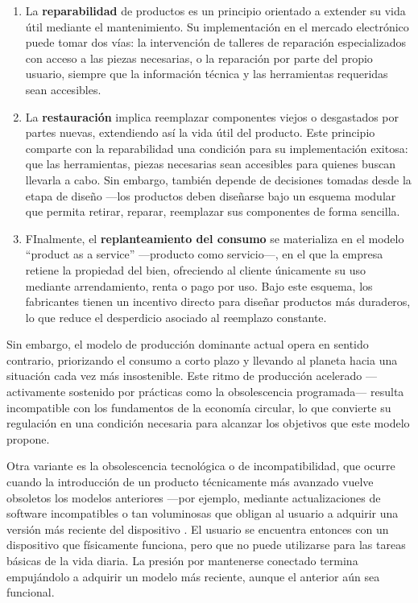 \begin{enumerate}
    \item La \textbf{reparabilidad} de productos es un principio orientado a
    extender su vida útil mediante el mantenimiento. Su implementación en el
    mercado electrónico puede tomar dos vías: la intervención de talleres de
    reparación especializados con acceso a las piezas necesarias, o la
    reparación por parte del propio usuario, siempre que la información técnica
    y las herramientas requeridas sean accesibles. 
    \item La \textbf{restauración} implica reemplazar componentes viejos o
    desgastados por partes nuevas, extendiendo así la vida útil del producto.
    Este principio comparte con la reparabilidad una condición para su
    implementación exitosa: que las herramientas, piezas necesarias sean
    accesibles para quienes buscan llevarla a cabo. Sin embargo, también depende
    de decisiones tomadas desde la etapa de diseño —los productos deben
    diseñarse bajo un esquema modular que permita retirar, reparar, reemplazar
    sus componentes de forma sencilla. 
    \item FInalmente, el \textbf{replanteamiento del consumo} se materializa en
    el modelo ``product as a service'' —producto como servicio—, en el que la
    empresa retiene la propiedad del bien, ofreciendo al cliente únicamente su
    uso mediante arrendamiento, renta o pago por uso. Bajo este esquema, los
    fabricantes tienen un incentivo directo para diseñar productos más
    duraderos, lo que reduce el desperdicio asociado al reemplazo constante. 
\end{enumerate}

Sin embargo, el modelo de producción dominante actual opera en sentido
contrario, priorizando el consumo a corto plazo y llevando al planeta hacia una
situación cada vez más insostenible. Este ritmo de producción acelerado
—activamente sostenido por prácticas como la obsolescencia programada— resulta
incompatible con los fundamentos de la economía circular, lo que convierte su
regulación en una condición necesaria para alcanzar los objetivos que este
modelo propone. 

Otra variante es la obsolescencia tecnológica o de incompatibilidad, que ocurre
cuando la introducción de un producto técnicamente más avanzado vuelve obsoletos
los modelos anteriores —por ejemplo, mediante actualizaciones de software
incompatibles o tan voluminosas que obligan al usuario a adquirir una versión
más reciente del dispositivo \parencite[p.~724]{malinauskaite2021}. El usuario
se encuentra entonces con un dispositivo que físicamente funciona, pero que no
puede utilizarse para las tareas básicas de la vida diaria. La presión por
mantenerse conectado termina empujándolo a adquirir un modelo más reciente,
aunque el anterior aún sea funcional. 


